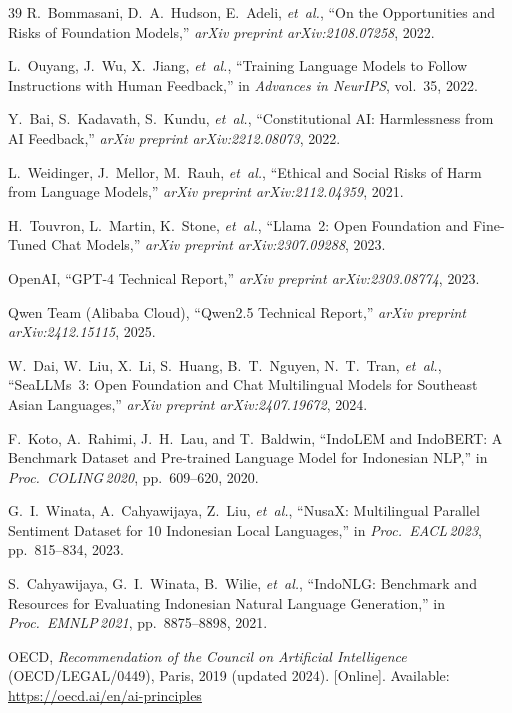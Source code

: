 \documentclass[conference]{IEEEtran}
\begin{document}
\begin{thebibliography}{39}
R.~Bommasani, D.~A.~Hudson, E.~Adeli, \textit{et~al.}, ``On the Opportunities
and Risks of Foundation Models,'' \textit{arXiv preprint arXiv:2108.07258}, 2022.

L.~Ouyang, J.~Wu, X.~Jiang, \textit{et~al.}, ``Training Language Models to
Follow Instructions with Human Feedback,'' in \textit{Advances in NeurIPS},
vol.~35, 2022.

Y.~Bai, S.~Kadavath, S.~Kundu, \textit{et~al.}, ``Constitutional AI:
Harmlessness from AI Feedback,'' \textit{arXiv preprint arXiv:2212.08073}, 2022.

L.~Weidinger, J.~Mellor, M.~Rauh, \textit{et~al.}, ``Ethical and Social Risks
of Harm from Language Models,'' \textit{arXiv preprint arXiv:2112.04359}, 2021.

H.~Touvron, L.~Martin, K.~Stone, \textit{et~al.}, ``Llama~2: Open Foundation
and Fine-Tuned Chat Models,'' \textit{arXiv preprint arXiv:2307.09288}, 2023.

OpenAI, ``GPT-4 Technical Report,'' \textit{arXiv preprint arXiv:2303.08774},
2023.

Qwen Team (Alibaba Cloud), ``Qwen2.5 Technical Report,''
\textit{arXiv preprint arXiv:2412.15115}, 2025.

W.~Dai, W.~Liu, X.~Li, S.~Huang, B.~T.~Nguyen, N.~T.~Tran, \textit{et~al.},
``SeaLLMs~3: Open Foundation and Chat Multilingual Models for Southeast Asian
Languages,'' \textit{arXiv preprint arXiv:2407.19672}, 2024.

F.~Koto, A.~Rahimi, J.~H.~Lau, and T.~Baldwin, ``IndoLEM and IndoBERT:
A Benchmark Dataset and Pre-trained Language Model for Indonesian NLP,''
in \textit{Proc.\ COLING\,2020}, pp.~609--620, 2020.

G.~I.~Winata, A.~Cahyawijaya, Z.~Liu, \textit{et~al.}, ``NusaX: Multilingual
Parallel Sentiment Dataset for 10 Indonesian Local Languages,''
in \textit{Proc.\ EACL\,2023}, pp.~815--834, 2023.

S.~Cahyawijaya, G.~I.~Winata, B.~Wilie, \textit{et~al.}, ``IndoNLG: Benchmark
and Resources for Evaluating Indonesian Natural Language Generation,''
in \textit{Proc.\ EMNLP\,2021}, pp.~8875--8898, 2021.

OECD, \textit{Recommendation of the Council on Artificial Intelligence}
(OECD/LEGAL/0449), Paris, 2019 (updated 2024). [Online]. Available:
\url{https://oecd.ai/en/ai-principles}


\end{thebibliography}
\end{document}
